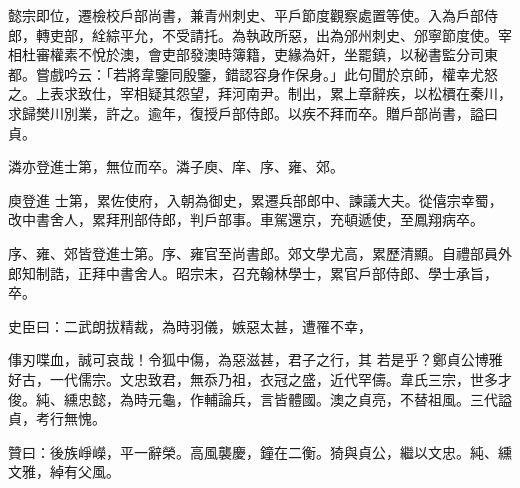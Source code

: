 \begin{pinyinscope}
 懿宗即位，遷檢校戶部尚書，兼青州刺史、平戶節度觀察處置等使。入為戶部侍
 郎，轉吏部，絟綜平允，不受請托。為執政所惡，出為邠州刺史、邠寧節度使。宰相杜審權素不悅於澳，會吏部發澳時簿籍，吏緣為奸，坐罷鎮，以秘書監分司東都。嘗戲吟云：「若將韋鑒同殷鑒，錯認容身作保身。」此句聞於京師，權幸尤怒之。上表求致仕，宰相疑其怨望，拜河南尹。制出，累上章辭疾，以松檟在秦川，求歸樊川別業，許之。逾年，復授戶部侍郎。以疾不拜而卒。贈戶部尚書，謚曰貞。



 潾亦登進士第，無位而卒。潾子庾、庠、序、雍、郊。



 庾登進
 士第，累佐使府，入朝為御史，累遷兵部郎中、諫議大夫。從僖宗幸蜀，改中書舍人，累拜刑部侍郎，判戶部事。車駕還京，充頓遞使，至鳳翔病卒。



 序、雍、郊皆登進士第。序、雍官至尚書郎。郊文學尤高，累歷清顯。自禮部員外郎知制誥，正拜中書舍人。昭宗末，召充翰林學士，累官戶部侍郎、學士承旨，卒。



 史臣曰：二武朗拔精裁，為時羽儀，嫉惡太甚，遭罹不幸，



 倳刃喋血，誠可哀哉！令狐中傷，為惡滋甚，君子之行，其
 若是乎？鄭貞公博雅好古，一代儒宗。文忠致君，無忝乃祖，衣冠之盛，近代罕儔。韋氏三宗，世多才俊。純、纁忠懿，為時元龜，作輔論兵，言皆體國。澳之貞亮，不替祖風。三代謚貞，考行無愧。



 贊曰：後族崢嶸，平一辭榮。高風襲慶，鐘在二衡。猗與貞公，繼以文忠。純、纁文雅，綽有父風。



\end{pinyinscope}